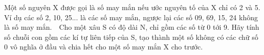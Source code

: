 Một số nguyên X được gọi là số may mắn nếu ước nguyên tố của X chỉ có 2 và 5. Ví dụ các số 2, 10, 25... là các số may mắn, ngược lại các số 09, 69, 15, 24 không là số may mắn.  Cho một xâu S có độ dài N, chỉ gồm các số từ 0 tới 9. Hãy tính số chuỗi con gồm các kí tự liên tiếp của S, tạo thành một số không có các chữ số 0 vô nghĩa ở đầu và chia hết cho một số may mắn X cho trước.  

\